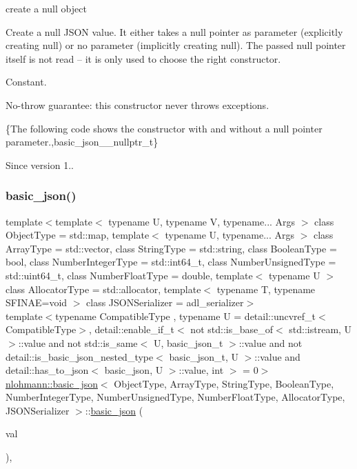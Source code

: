 create a null object 

Create a {\ttfamily null} J\+S\+ON value. It either takes a null pointer as parameter (explicitly creating {\ttfamily null}) or no parameter (implicitly creating {\ttfamily null}). The passed null pointer itself is not read -- it is only used to choose the right constructor.

Constant.

No-\/throw guarantee\+: this constructor never throws exceptions.

\{The following code shows the constructor with and without a null pointer parameter.,basic\+\_\+json\+\_\+\+\_\+nullptr\+\_\+t\}

\begin{DoxySince}{Since}
version 1.. 
\end{DoxySince}
\mbox{\label{classnlohmann_1_1basic__json_a5a6558bfd1be139a638f91f0e09fc737}} 
\subsubsection{\texorpdfstring{basic\+\_\+json()}{basic\_json()}\hspace{0.1cm}{\footnotesize\ttfamily [3/8]}}
{\footnotesize\ttfamily template$<$template$<$ typename U, typename V, typename... Args $>$ class Object\+Type = std\+::map, template$<$ typename U, typename... Args $>$ class Array\+Type = std\+::vector, class String\+Type  = std\+::string, class Boolean\+Type  = bool, class Number\+Integer\+Type  = std\+::int64\+\_\+t, class Number\+Unsigned\+Type  = std\+::uint64\+\_\+t, class Number\+Float\+Type  = double, template$<$ typename U $>$ class Allocator\+Type = std\+::allocator, template$<$ typename T, typename S\+F\+I\+N\+A\+E=void $>$ class J\+S\+O\+N\+Serializer = adl\+\_\+serializer$>$ \\
template$<$typename Compatible\+Type , typename U  = detail\+::uncvref\+\_\+t$<$\+Compatible\+Type$>$, detail\+::enable\+\_\+if\+\_\+t$<$ not std\+::is\+\_\+base\+\_\+of$<$ std\+::istream, U $>$\+::value and not std\+::is\+\_\+same$<$ U, basic\+\_\+json\+\_\+t $>$\+::value and not detail\+::is\+\_\+basic\+\_\+json\+\_\+nested\+\_\+type$<$ basic\+\_\+json\+\_\+t, U $>$\+::value and detail\+::has\+\_\+to\+\_\+json$<$ basic\+\_\+json, U $>$\+::value, int $>$  = 0$>$ \\
\mbox{\hyperlink{classnlohmann_1_1basic__json}{nlohmann\+::basic\+\_\+json}}$<$ Object\+Type, Array\+Type, String\+Type, Boolean\+Type, Number\+Integer\+Type, Number\+Unsigned\+Type, Number\+Float\+Type, Allocator\+Type, J\+S\+O\+N\+Serializer $>$\+::\mbox{\hyperlink{classnlohmann_1_1basic__json}{basic\+\_\+json}} (\begin{DoxyParamCaption}\item[{Compatible\+Type \&\&}]{val }\end{DoxyParamCaption})\hspace{0.3cm}{\ttfamily [inline]}, {\ttfamily [noexcept]}}



